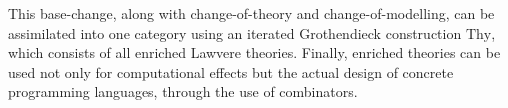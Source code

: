 \documentclass{amsart}
\theoremstyle{definition}
\newcommand{\Set}{\mathrm{Set}}
\newcommand{\op}{\mathrm{op}}
\newcommand{\V}{\mathscr{V}}
\begin{document}
This base-change, along with change-of-theory and change-of-modelling, can be assimilated into one category using an iterated Grothendieck construction $\mathrm{Thy}$, which consists of all enriched Lawvere theories. Finally, enriched theories can be used not only for computational effects but the actual design of concrete programming languages, through the use of combinators.



\end{document}
